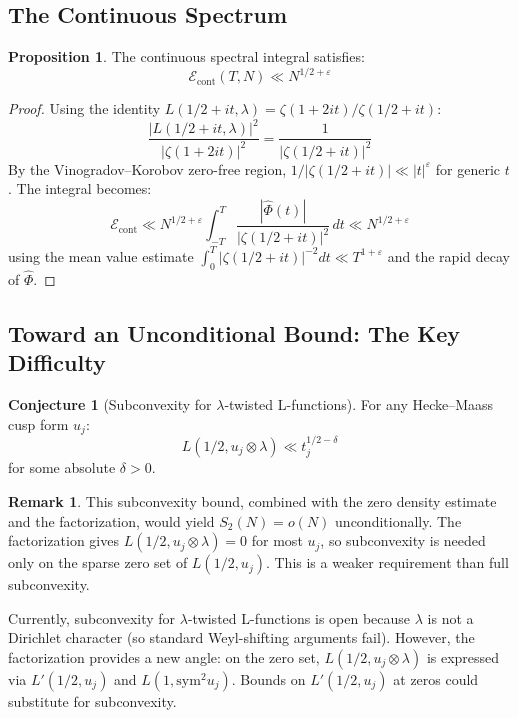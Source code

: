 \documentclass[11pt,a4paper]{article}
\theoremstyle{definition}
\newtheorem{proposition}[theorem]{Proposition}
\newtheorem{conjecture}[theorem]{Conjecture}
\newtheorem{remark}[theorem]{Remark}
\newcommand{\Sym}{\mathrm{sym}}
\newcommand{\cont}{\mathrm{cont}}
\begin{document}
\subsection{The Continuous Spectrum}

\begin{proposition}
\label{prop:continuous-bound}
The continuous spectral integral satisfies:
\begin{equation}
\mathcal{E}_{\cont}(T, N) \ll N^{1/2+\varepsilon}
\end{equation}
\end{proposition}

\begin{proof}
Using the identity $L(1/2+it, \lambda) = \zeta(1+2it)/\zeta(1/2+it)$:
\begin{equation}
\frac{|L(1/2+it, \lambda)|^2}{|\zeta(1+2it)|^2} = \frac{1}{|\zeta(1/2+it)|^2}
\end{equation}
By the Vinogradov--Korobov zero-free region, $1/|\zeta(1/2+it)| \ll |t|^{\varepsilon}$ for generic $t$. The integral becomes:
\begin{equation}
\mathcal{E}_{\cont} \ll N^{1/2+\varepsilon} \int_{-T}^{T} \frac{|\hat{\Phi}(t)|}{|\zeta(1/2+it)|^2} \, dt \ll N^{1/2+\varepsilon}
\end{equation}
using the mean value estimate $\int_0^T |\zeta(1/2+it)|^{-2} dt \ll T^{1+\varepsilon}$ and the rapid decay of $\hat{\Phi}$.
\end{proof}

\subsection{Toward an Unconditional Bound: The Key Difficulty}

\begin{conjecture}[Subconvexity for $\lambda$-twisted L-functions]
\label{conj:subconvexity}
For any Hecke--Maass cusp form $u_j$:
\begin{equation}
L(1/2, u_j \otimes \lambda) \ll t_j^{1/2 - \delta}
\end{equation}
for some absolute $\delta > 0$.
\end{conjecture}

\begin{remark}
This subconvexity bound, combined with the zero density estimate and the factorization, would yield $S_2(N) = o(N)$ unconditionally. The factorization gives $L(1/2, u_j \otimes \lambda) = 0$ for most $u_j$, so subconvexity is needed only on the sparse zero set of $L(1/2, u_j)$. This is a weaker requirement than full subconvexity.

Currently, subconvexity for $\lambda$-twisted L-functions is open because $\lambda$ is not a Dirichlet character (so standard Weyl-shifting arguments fail). However, the factorization provides a new angle: on the zero set, $L(1/2, u_j \otimes \lambda)$ is expressed via $L'(1/2, u_j)$ and $L(1, \Sym^2 u_j)$. Bounds on $L'(1/2, u_j)$ at zeros could substitute for subconvexity.
\end{remark}
\end{document}
